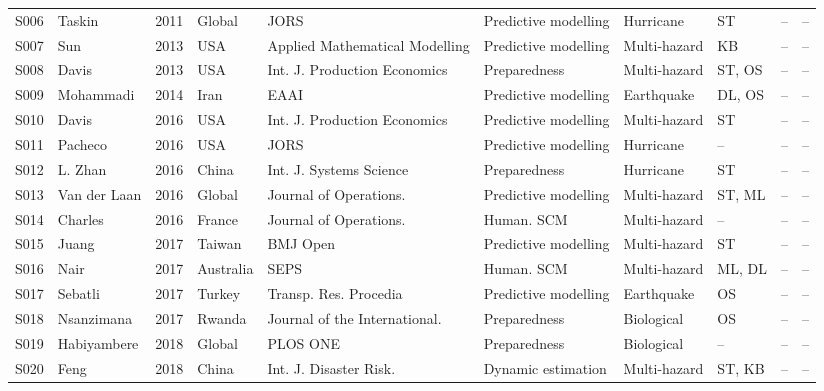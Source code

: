 \begin{landscape}
\begin{longtable}{@{}p{1.0cm}p{3.3cm}p{0.8cm}p{2.3cm}p{3.1cm}p{2.6cm}p{2.2cm}p{1.9cm}p{2.3cm}p{2.2cm}@{}}
S006 & Taskin \cite{Taskin2011AManagement} & 2011 & Global & JORS & Predictive modelling & Hurricane & ST & -- & -- \\
S007 & Sun \cite{Sun2013AUniverses} & 2013 & USA & Applied Mathematical Modelling & Predictive modelling & Multi-hazard & KB & -- & -- \\
S008 & Davis \cite{Davis2013InventoryEfforts} & 2013 & USA & Int. J. Production Economics & Preparedness & Multi-hazard & ST, OS & -- & -- \\
S009 & Mohammadi \cite{Mohammadi2014ASeries} & 2014 & Iran & EAAI & Predictive modelling & Earthquake & DL, OS & -- & -- \\
S010 & Davis \cite{Davis2016AnalysisOrganization} & 2016 & USA & Int. J. Production Economics & Predictive modelling & Multi-hazard & ST & -- & -- \\
S011 & Pacheco \cite{Pacheco2016Forecast-drivenHurricane} & 2016 & USA & JORS & Predictive modelling & Hurricane & -- & -- & -- \\
S012 & L. Zhan \cite{Zhan2016DeterminingUpdates} & 2016 & China & Int. J. Systems Science & Preparedness & Hurricane & ST & -- & -- \\
S013 & Van der Laan \cite{vanderLaan2016DemandAssessment} & 2016 & Global & Journal of Operations. & Predictive modelling & Multi-hazard & ST, ML & -- & -- \\
S014 & Charles \cite{Charles2016DesigningNetwork} & 2016 & France & Journal of Operations. & Human. SCM & Multi-hazard & -- & -- & -- \\
S015 & Juang \cite{Juang2017ApplicationTaiwan} & 2017 & Taiwan & BMJ Open & Predictive modelling & Multi-hazard & ST & -- & -- \\
S016 & Nair \cite{Nair2017EstimatingOperations} & 2017 & Australia & SEPS & Human. SCM & Multi-hazard & ML, DL & -- & -- \\
S017 & Sebatli \cite{Sebatli2017DeterminationFacilities} & 2017 & Turkey & Transp. Res. Procedia & Predictive modelling & Earthquake & OS & -- & -- \\
S018 & Nsanzimana \cite{Nsanzimana2017PhasedAll} & 2017 & Rwanda & Journal of the International. & Preparedness & Biological & OS & -- & -- \\
S019 & Habiyambere \cite{Habiyambere2018ForecastingAnalysis} & 2018 & Global & PLOS ONE & Preparedness & Biological & -- & -- & -- \\
S020 & Feng \cite{Feng2018ImprovingInfrastructure} & 2018 & China & Int. J. Disaster Risk. & Dynamic estimation & Multi-hazard & ST, KB & -- & -- \\

\end{longtable}
\end{landscape}
